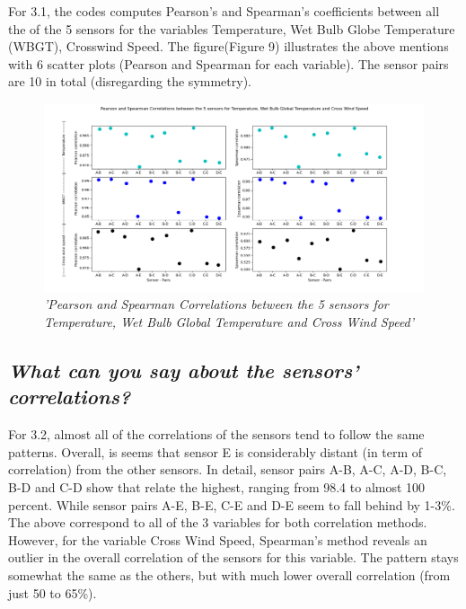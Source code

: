 \documentclass[a4paper,12pt]{article}
\begin{document}
For 3.1, the codes computes Pearson’s and Spearman’s 
coefficients between all the of the 5 sensors for the variables Temperature, 
Wet Bulb Globe Temperature (WBGT), Crosswind Speed. The figure(Figure 9) illustrates the above mentions with 6 scatter plots 
(Pearson and Spearman for each variable). The sensor pairs are 10 in total (disregarding the symmetry).



\begin{figure}[H]
\centering
\includegraphics[width=\textwidth]{Graphs/Pearson-Spearman_5_sensors_Temp,_WBGT,CrWinSpeed.png}
\caption{\it'Pearson and Spearman Correlations between the 5 sensors for Temperature, Wet Bulb Global Temperature and Cross Wind Speed'}
\end{figure}




\subsection{\it What can you say about the sensors’ correlations?}





For 3.2, almost all of the correlations of the 
sensors tend to follow the same patterns. Overall, is seems that sensor E 
is considerably distant (in term of correlation) from the other sensors. In 
detail, sensor pairs A-B, A-C, A-D, B-C, B-D and C-D show that relate the highest, 
ranging from 98.4 to almost 100 percent. While sensor pairs A-E, B-E, C-E and 
D-E seem to fall behind by 1-3\%. The above correspond to all of the 3 variables for both correlation methods. 
However, for the variable Cross Wind Speed, Spearman’s method reveals an outlier in the overall correlation 
of the sensors for this variable. The pattern stays somewhat the same as the others, but with much lower overall correlation (from just 50 to 65\%). 
\end{document}
